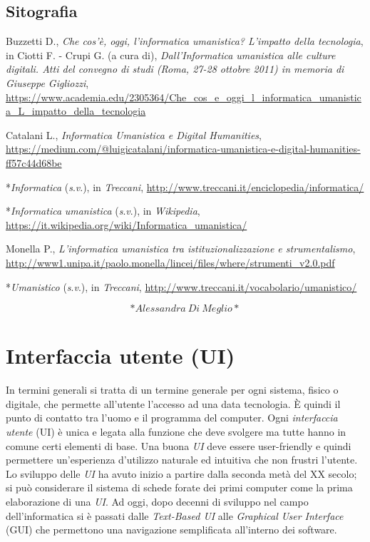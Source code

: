 \documentclass[
  b5paper,
  twoside,
  12pt,
  chapterprefix=false,
  bibliography=totocnumbered,
  parskip=false]{scrbook}
\begin{document}
\hypertarget{sitografia-18}{%
\section*{Sitografia}\label{sitografia-18}}

Buzzetti D., \emph{Che cos'è, oggi, l'informatica umanistica? L'impatto della
tecnologia}, in Ciotti F. - Crupi G. (a cura di), \emph{Dall'Informatica
umanistica alle culture digitali. Atti del convegno di studi (Roma,
27-28 ottobre 2011) in memoria di Giuseppe Gigliozzi},
\url{https://www.academia.edu/2305364/Che_cos_e_oggi_l_informatica_umanistica_L_impatto_della_tecnologia}

Catalani L., \emph{Informatica Umanistica e Digital Humanities},
\url{https://medium.com/@luigicatalani/informatica-umanistica-e-digital-humanities-ff57c44d68be}

*\emph{Informatica} (\emph{s}.\emph{v}.), in \emph{Treccani},
\url{http://www.treccani.it/enciclopedia/informatica/}

*\emph{Informatica} \emph{umanistica} (\emph{s}.\emph{v}.), in \emph{Wikipedia},
\url{https://it.wikipedia.org/wiki/Informatica_umanistica/}

Monella P., \emph{L'informatica umanistica tra istituzionalizzazione e
strumentalismo},
\url{http://www1.unipa.it/paolo.monella/lincei/files/where/strumenti_v2.0.pdf}

*\emph{Umanistico} (\emph{s}.\emph{v}.), in \emph{Treccani},
\url{http://www.treccani.it/vocabolario/umanistico/}

\[*Alessandra~Di~Meglio*\]

\hypertarget{interfaccia-utente-ui}{%
\chapter{Interfaccia utente (UI)}\label{interfaccia-utente-ui}}

In termini generali si tratta di un termine generale per ogni sistema,
fisico o digitale, che permette all'utente l'accesso ad una data
tecnologia. È quindi il punto di contatto tra l'uomo e il programma del
computer. Ogni \emph{interfaccia utente} (UI) è unica e legata alla funzione
che deve svolgere ma tutte hanno in comune certi elementi di base. Una
buona \emph{UI} deve essere user-friendly e quindi permettere un'esperienza
d'utilizzo naturale ed intuitiva che non frustri l'utente. Lo sviluppo
delle \emph{UI} ha avuto inizio a partire dalla seconda metà del XX secolo;
si può considerare il sistema di schede forate dei primi computer come
la prima elaborazione di una \emph{UI}. Ad oggi, dopo decenni di sviluppo nel
campo dell'informatica si è passati dalle \emph{Text-Based UI} alle
\emph{Graphical User Interface} (GUI) che permettono una navigazione
semplificata all'interno dei software.
\end{document}
